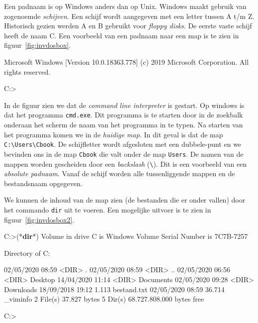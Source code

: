 Een padnaam is op Windows anders dan op Unix. Windows maakt gebruik van zogenoemde \textsl{schijven}. Een schijf wordt aangegeven met een letter tussen A t/m Z. Historisch gezien werden A en B gebruikt voor \textsl{floppy disks}. De eerste vaste schijf heeft de naam C. Een voorbeeld van een padnaam naar een map is te zien in figuur~\ref{fig:invdosbox}.

\begin{dosbox}[title=Starten van een DOS-box.,label=fig:invdosbox]
Microsoft Windows [Version 10.0.18363.778]
(c) 2019 Microsoft Corporation. All rights reserved.

C:\Users\Cbook>
\end{dosbox}

In de figuur zien we dat de \textsl{command line interpreter} is gestart. Op windows is dat het programma \texttt{cmd.exe}. Dit programma is te starten door in de zoekbalk onderaan het scherm de naam van het programma in te typen. Na starten van het programma komen we in de \textsl{huidige map.} In dit geval is dat de map \texttt{C:\textbackslash Users\textbackslash Cbook}. De schijfletter wordt afgesloten met een dubbele-punt en we bevinden ons in de map \texttt{Cbook} die valt onder de map \texttt{Users}. De namen van de mappen worden gescheiden door een \textsl{backslash} (\texttt{\textbackslash}). Dit is een voorbeeld van een \textsl{absolute padnaam}. Vanaf de schijf worden alle tussenliggende mappen en de bestandsnaam opgegeven.

We kunnen de inhoud van de map zien (de bestanden die er onder vallen) door het commando \texttt{dir} uit te voeren. Een mogelijke uitvoer is te zien in figuur~\ref{fig:invdosbox2}.

\begin{dosbox}[title=Uitvoer van het \texttt{dir}-commando.,label=fig:invdosbox2]
C:\Users\Cbook>(*\textbf{dir}*)
 Volume in drive C is Windows
 Volume Serial Number is 7C7B-7257

 Directory of C:\Users\Cbook

02/05/2020  08:59    <DIR>          .
02/05/2020  08:59    <DIR>          ..
02/05/2020  06:56    <DIR>          Desktop
14/04/2020  11:14    <DIR>          Documents
02/05/2020  09:28    <DIR>          Downloads
18/09/2018  19:12             1.113 bestand.txt
02/05/2020  08:59            36.714 _viminfo
              2 File(s)          37.827 bytes
              5 Dir(s)   68.727.808.000 bytes free

C:\Users\Cbook>
\end{dosbox}

